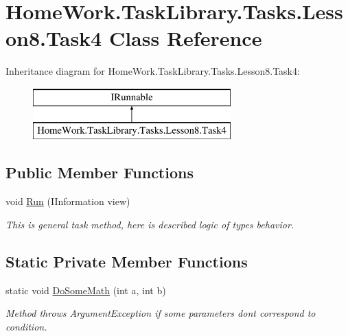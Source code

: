 \hypertarget{class_home_work_1_1_task_library_1_1_tasks_1_1_lesson8_1_1_task4}{}\section{Home\+Work.\+Task\+Library.\+Tasks.\+Lesson8.\+Task4 Class Reference}
\label{class_home_work_1_1_task_library_1_1_tasks_1_1_lesson8_1_1_task4}
Inheritance diagram for Home\+Work.\+Task\+Library.\+Tasks.\+Lesson8.\+Task4\+:\begin{figure}[H]
\begin{center}
\leavevmode
\includegraphics[height=2.000000cm]{class_home_work_1_1_task_library_1_1_tasks_1_1_lesson8_1_1_task4}
\end{center}
\end{figure}
\subsection*{Public Member Functions}
\begin{DoxyCompactItemize}
\item 
void \mbox{\hyperlink{class_home_work_1_1_task_library_1_1_tasks_1_1_lesson8_1_1_task4_aae175a76e9321e07895e506e7726dc79}{Run}} (I\+Information view)
\begin{DoxyCompactList}\small\item\em This is general task method, here is described logic of types behavior. \end{DoxyCompactList}\end{DoxyCompactItemize}
\subsection*{Static Private Member Functions}
\begin{DoxyCompactItemize}
\item 
static void \mbox{\hyperlink{class_home_work_1_1_task_library_1_1_tasks_1_1_lesson8_1_1_task4_abaf765fbbd26120a5c245a3b32e1229c}{Do\+Some\+Math}} (int a, int b)
\begin{DoxyCompactList}\small\item\em Method throws Argument\+Exception if some parameters don\textquotesingle{}t correspond to condition. \end{DoxyCompactList}\end{DoxyCompactItemize}



